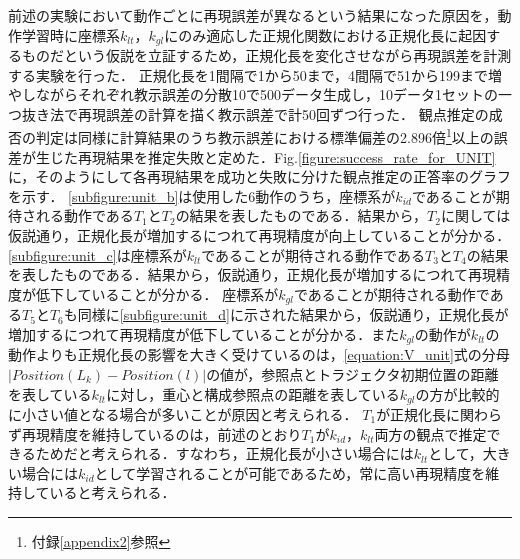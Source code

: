 前述の実験において動作ごとに再現誤差が異なるという結果になった原因を，動作学習時に座標系$k_{lt}$，$k_{gl}$にのみ適応した正規化関数における正規化長に起因するものだという仮説を立証するため，正規化長を変化させながら再現誤差を計測する実験を行った．
正規化長を1間隔で1から50まで，4間隔で51から199まで増やしながらそれぞれ教示誤差の分散10で500データ生成し，10データ1セットの一つ抜き法で再現誤差の計算を描く教示誤差で計50回ずつ行った．
観点推定の成否の判定は同様に計算結果のうち教示誤差における標準偏差の2.896倍\footnote{付録\ref{appendix2}参照}以上の誤差が生じた再現結果を推定失敗と定めた．Fig.\ref{figure:success_rate_for_UNIT}に，そのようにして各再現結果を成功と失敗に分けた観点推定の正答率のグラフを示す．
\ref{subfigure:unit_b}は使用した6動作のうち，座標系が$k_{id}$であることが期待される動作である$T_{1}$と$T_{2}$の結果を表したものである．結果から，$T_{2}$に関しては仮説通り，正規化長が増加するにつれて再現精度が向上していることが分かる．
\ref{subfigure:unit_c}は座標系が$k_{lt}$であることが期待される動作である$T_{3}$と$T_{4}$の結果を表したものである．結果から，仮説通り，正規化長が増加するにつれて再現精度が低下していることが分かる．
座標系が$k_{gl}$であることが期待される動作である$T_{5}$と$T_{6}$も同様に\ref{subfigure:unit_d}に示された結果から，仮説通り，正規化長が増加するにつれて再現精度が低下していることが分かる．また$k_{gl}$の動作が$k_{lt}$の動作よりも正規化長の影響を大きく受けているのは，\ref{equation:V_unit}式の分母$| Position(L_{k})-Position(l) |$の値が，参照点とトラジェクタ初期位置の距離を表している$k_{lt}$に対し，重心と構成参照点の距離を表している$k_{gl}$の方が比較的に小さい値となる場合が多いことが原因と考えられる．
$T_{1}$が正規化長に関わらず再現精度を維持しているのは，前述のとおり$T_{1}$が$k_{id}$，$k_{lt}$両方の観点で推定できるためだと考えられる．すなわち，正規化長が小さい場合には$k_{lt}$として，大きい場合には$k_{id}$として学習されることが可能であるため，常に高い再現精度を維持していると考えられる．

